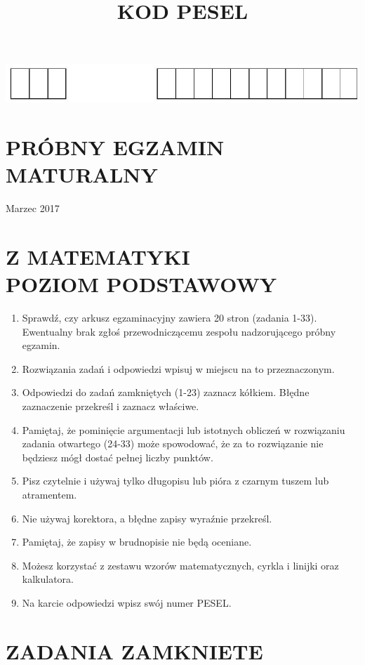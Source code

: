 \documentclass[10pt]{article}
\title{KOD PESEL }
\author{}
\date{}
\begin{document}
\maketitle
\begin{center}
\includegraphics[max width=\textwidth]{2024_11_21_94f02db55673a8a7b820g-01}
\end{center}

\section*{PRÓBNY EGZAMIN MATURALNY}
Marzec 2017

\section*{Z MATEMATYKI \\
 POZIOM PODSTAWOWY}
\begin{enumerate}
  \item Sprawdź, czy arkusz egzaminacyjny zawiera 20 stron (zadania 1-33). Ewentualny brak zgłoś przewodniczącemu zespołu nadzorującego próbny egzamin.
  \item Rozwiązania zadań i odpowiedzi wpisuj w miejscu na to przeznaczonym.
  \item Odpowiedzi do zadań zamkniętych (1-23) zaznacz kółkiem. Błędne zaznaczenie przekreśl i zaznacz właściwe.
  \item Pamiętaj, że pominięcie argumentacji lub istotnych obliczeń w rozwiązaniu zadania otwartego (24-33) może spowodować, że za to rozwiązanie nie będziesz mógł dostać pełnej liczby punktów.
  \item Pisz czytelnie i używaj tylko długopisu lub pióra z czarnym tuszem lub atramentem.
  \item Nie używaj korektora, a błędne zapisy wyraźnie przekreśl.
  \item Pamiętaj, że zapisy w brudnopisie nie będą oceniane.
  \item Możesz korzystać z zestawu wzorów matematycznych, cyrkla i linijki oraz kalkulatora.
  \item Na karcie odpowiedzi wpisz swój numer PESEL.
\end{enumerate}

\section*{ZADANIA ZAMKNIETE}
\end{document}
